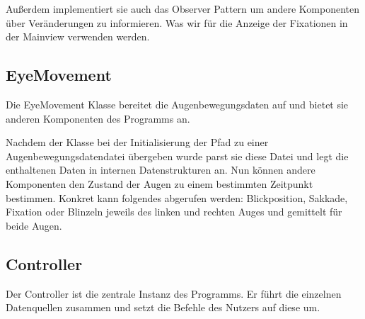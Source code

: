 \documentclass[a4paper,draft]{scrartcl}
\begin{document}
Außerdem implementiert sie auch das Observer Pattern um andere Komponenten über Veränderungen zu informieren. Was wir für die Anzeige der Fixationen in der Mainview verwenden werden.

\subsection{EyeMovement}
Die EyeMovement Klasse bereitet die Augenbewegungsdaten auf und bietet sie anderen Komponenten des Programms an.

Nachdem der Klasse bei der Initialisierung der Pfad zu einer Augenbewegungsdatendatei übergeben wurde parst sie diese Datei und legt die enthaltenen Daten in internen Datenstrukturen an. Nun können andere Komponenten den Zustand der Augen zu einem bestimmten Zeitpunkt bestimmen. Konkret kann folgendes abgerufen werden: Blickposition, Sakkade, Fixation oder Blinzeln jeweils des linken und rechten Auges und gemittelt für beide Augen.

\subsection{Controller}
Der Controller ist die zentrale Instanz des Programms. Er führt die einzelnen Datenquellen zusammen und setzt die Befehle des Nutzers auf diese um.
\end{document}
